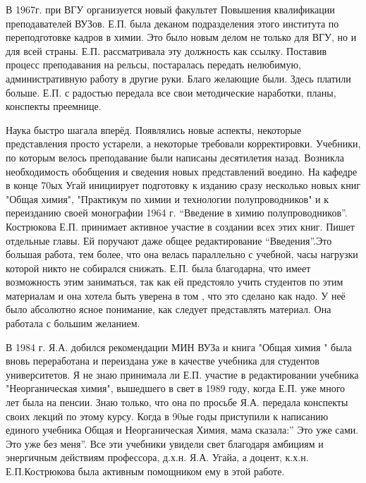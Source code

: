 В 1967г. при ВГУ организуется новый факультет Повышения квалификации преподавателей ВУЗов. Е.П. была деканом подразделения этого института по переподготовке кадров в химии. Это было новым делом не только для ВГУ, но и для всей страны. Е.П. рассматривала эту должность как ссылку. Поставив процесс преподавания на рельсы, постаралась передать нелюбимую, административную работу в другие руки. Благо желающие были. Здесь платили больше. Е.П. с радостью передала все свои методические наработки, планы, конспекты преемнице.

Наука быстро шагала вперёд. Появлялись новые аспекты, некоторые представления просто устарели, а некоторые требовали корректировки. Учебники, по которым велось преподавание были написаны десятилетия назад. Возникла необходимость обобщения и сведения новых представлений воедино. На кафедре в конце 70ых Угай инициирует подготовку к изданию сразу несколько новых книг "Общая химия", "Практикум по химии и технологии полупроводников" и к переизданию своей монографии 1964 г. “Введение в химию полупроводников”. Кострюкова Е.П. принимает активное участие в создании всех этих книг. Пишет отдельные главы. Ей поручают даже общее редактирование “Введения”.Это большая работа, тем более, что она велась параллельно с учебной, часы нагрузки которой никто не собирался снижать. Е.П. была благодарна, что имеет возможность этим заниматься, так как ей предстояло учить студентов по этим материалам и она хотела быть уверена в том , что это сделано как надо. У неё было абсолютно ясное понимание, как следует представлять материал. Она работала с большим желанием.

В 1984 г. Я.А. добился рекомендации МИН ВУЗа и книга "Общая химия " была вновь переработана и переиздана уже в качестве учебника для студентов университетов. Я не знаю принимала ли Е.П. участие в редактировании учебника "Неорганическая химия", вышедшего в свет в 1989 году, когда Е.П. уже много лет была на пенсии. Знаю только, что она по просьбе Я.А. передала конспекты своих лекций по этому курсу. Когда в 90ые годы приступили к написанию единого учебника Общая и Неорганическая Химия, мама сказала:” Это уже сами. Это уже без меня”. Все эти учебники увидели свет благодаря амбициям и энергичным действиям профессора, д.х.н. Я.А. Угайа, а доцент, к.х.н. Е.П.Кострюкова была активным помощником ему в этой работе.


